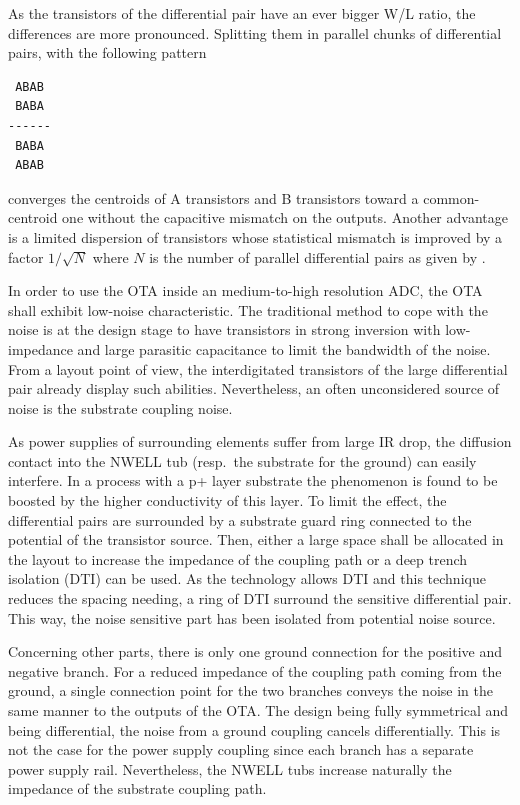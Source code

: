As the transistors of the differential pair have an ever bigger W/L ratio, the differences are more pronounced. Splitting them in parallel chunks of differential pairs, with the following pattern
\begin{verbatim}
 ABAB
 BABA
------
 BABA
 ABAB
\end{verbatim}
converges the centroids of A transistors and B transistors toward a common-centroid one without the capacitive mismatch on the outputs. Another advantage is a limited dispersion of transistors whose statistical mismatch is improved by a factor \(1/\sqrt{N}\) where \(N\) is the number of parallel differential pairs as given by \cite{Conti2002}.

In order to use the OTA inside an medium-to-high resolution ADC, the OTA shall exhibit low-noise characteristic. The traditional method to cope with the noise is at the design stage to have transistors in strong inversion with low-impedance and large parasitic capacitance to limit the bandwidth of the noise. From a layout point of view, the interdigitated transistors of the large differential pair already display such abilities. Nevertheless, an often unconsidered source of noise is the substrate coupling noise.

As power supplies of surrounding elements suffer from large IR drop, the diffusion contact into the NWELL tub (resp.\ the substrate for the ground) can easily interfere. In a process with a p+ layer substrate the phenomenon is found to be boosted by the higher conductivity of this layer. To limit the effect, the differential pairs are surrounded by a substrate guard ring connected to the potential of the transistor source. Then, either a large space shall be allocated in the layout to increase the impedance of the coupling path or a deep trench isolation (DTI) can be used. As the technology allows DTI and this technique reduces the spacing needing, a ring of DTI surround the sensitive differential pair. This way, the noise sensitive part has been isolated from potential noise source.

Concerning other parts, there is only one ground connection for the positive and negative branch. For a reduced impedance of the coupling path coming from the ground, a single connection point for the two branches conveys the noise in the same manner to the outputs of the OTA\@. The design being fully symmetrical and being differential, the noise from a ground coupling cancels differentially. This is not the case for the power supply coupling since each branch has a separate power supply rail. Nevertheless, the NWELL tubs increase naturally the impedance of the substrate coupling path.

